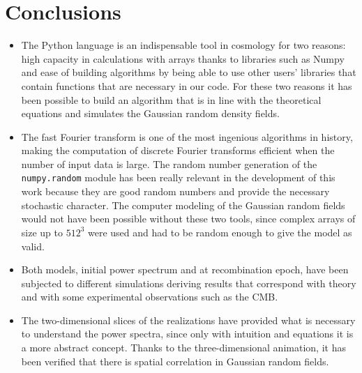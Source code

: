 \chapter*{Conclusions}
\begin{itemize}
    \item The Python language is an indispensable tool in cosmology for two reasons: high capacity in calculations with arrays thanks to libraries such as Numpy and ease of building algorithms by being able to use other users' libraries that contain functions that are necessary in our code. For these two reasons it has been possible to build an algorithm that is in line with the theoretical equations and simulates the Gaussian random density fields.
    \item The fast Fourier transform is one of the most ingenious algorithms in history, making the computation of discrete Fourier transforms efficient when the number of input data is large. The random number generation of the \texttt{numpy.random} module has been really relevant in the development of this work because they are good random numbers and provide the necessary stochastic character. The computer modeling of the Gaussian random fields would not have been possible without these two tools, since complex arrays of size up to \(512^3\) were used and had to be random enough to give the model as valid.
    \item Both models, initial power spectrum and at recombination epoch, have been subjected to different simulations deriving results that correspond with theory and with some experimental observations such as the CMB.
    \item The two-dimensional slices of the realizations have provided what is necessary to understand the power spectra, since only with intuition and equations it is a more abstract concept. Thanks to the three-dimensional animation, it has been verified that there is spatial correlation in Gaussian random fields.
\end{itemize}